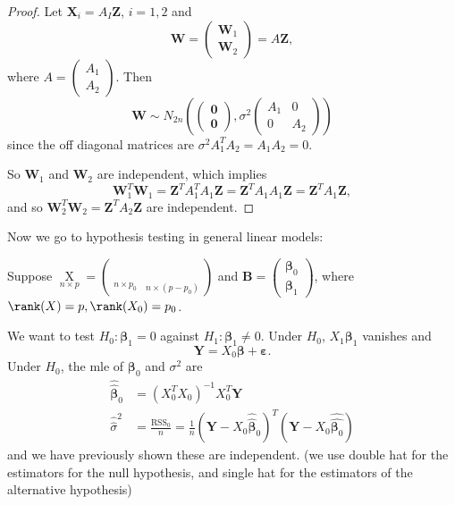 \documentclass[a4paper]{article}
\begin{document}
\begin{proof}
  Let $\mathbf{X}_i = A_I \mathbf{Z}$, $i = 1, 2$ and
  \[
    \mathbf{W} =
    \begin{pmatrix}
      \mathbf{W}_1\\
      \mathbf{W}_2
    \end{pmatrix} = A\mathbf{Z},
  \]
  where $A = \begin{pmatrix}A_1\\A_2\end{pmatrix}$. Then
  \[
    \mathbf{W}\sim N_{2n}\left(
    \begin{pmatrix}
      \mathbf{0}\\
      \mathbf{0}
    \end{pmatrix}, \sigma^2
    \begin{pmatrix}
      A_1 & 0\\
      0 & A_2
    \end{pmatrix}\right)
  \]
  since the off diagonal matrices are $\sigma^2 A_1^TA_2 = A_1A_2 = 0$.

  So $\mathbf{W}_1$ and $\mathbf{W}_2$ are independent, which implies
  \[
    \mathbf{W}_1^T \mathbf{W}_1 = \mathbf{Z}^TA_1^TA_1 \mathbf{Z} = \mathbf{Z}^T A_1A_1 \mathbf{Z} = \mathbf{Z}^T A_1 \mathbf{Z},
  \]
  and so $\mathbf{W}_2^T\mathbf{W}_2 = \mathbf{Z}^TA_2 \mathbf{Z}$ are independent.
\end{proof}
Now we go to hypothesis testing in general linear models:

Suppose $\mathop{X}\limits_{n \times p} = \left(\mathop{X_0}\limits_{n \times p_0}\, \mathop{X_1}\limits_{n \times (p - p_0)}\right)$ and $\mathbf{B} = \begin{pmatrix}\boldsymbol\beta_0 \\ \boldsymbol\beta_1\end{pmatrix}$, where $\rank (X) = p, \rank(X_0) = p_0$.

We want to test $H_0: \boldsymbol\beta_1 = 0$ against $H_1: \boldsymbol\beta_1 \not= 0$. Under $H_0$, $X_1 \boldsymbol\beta_1$ vanishes and
\[
  \mathbf{Y} = X_0 \boldsymbol\beta + \boldsymbol\varepsilon.
\]
Under $H_0$, the mle of $\boldsymbol\beta_0$ and $\sigma^2$ are
\begin{align*}
  \hat{\hat{\boldsymbol\beta}}_0 &= (X_0^TX_0)^{-1}X_0^T \mathbf{Y}\\
  \hat{\hat{\sigma}}^2 &= \frac{\mathrm{RSS}_0}{n} = \frac{1}{n} (\mathbf{Y} - X_0 \hat{\hat{\boldsymbol\beta}}_0)^T(\mathbf{Y} - X_0 \hat{\hat{\boldsymbol\beta_0}})
\end{align*}
and we have previously shown these are independent. (we use double hat for the estimators for the null hypothesis, and single hat for the estimators of the alternative hypothesis)
\end{document}
